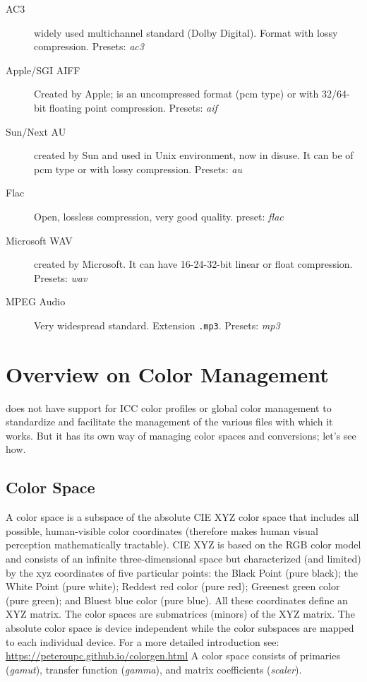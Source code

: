 \begin{description}
	\item[AC3] widely used multichannel standard (Dolby Digital). Format with lossy compression.
	\newline    Presets: \textit{ac3}
	\item[Apple/SGI AIFF] Created by Apple; is an uncompressed format (pcm type) or with 32/64-bit floating point compression.
	\newline    Presets: \textit{aif}
	\item[Sun/Next AU] created by Sun and used in Unix environment, now in disuse. It can be of pcm type or with lossy compression.
	\newline    Presets: \textit{au}
	\item[Flac] Open, lossless compression, very good quality.
	\newline    preset: \textit{flac}
	\item[Microsoft WAV]  created by Microsoft. It can have 16-24-32-bit linear or float compression.
	\newline    Presets: \textit{wav}
	\item[MPEG Audio] Very widespread standard. Extension \texttt{.mp3}.
	\newline    Presets: \textit{mp3}
\end{description}

\section{Overview on Color Management}%
\label{sec:overview_color_management}

\CGG{} does not have support for ICC color profiles or global color management to standardize and facilitate the management of the various files with which it works. But it has its own way of managing color spaces and conversions; let's see how.

\subsection{Color Space}%
\label{sub:the_color_spaces}

A color space is a subspace of the absolute CIE XYZ color space that includes all possible, human-visible color coordinates (therefore makes human visual perception mathematically tractable). CIE XYZ is based on the RGB color model and consists of an infinite three-dimensional space but characterized (and limited) by the xyz coordinates of five particular points: the Black Point (pure black); the White Point (pure white); Reddest red color (pure red); Greenest green color (pure green); and Bluest blue color (pure blue). All these coordinates define an XYZ matrix. The color spaces are submatrices (minors) of the XYZ matrix. The absolute color space is device independent while the color subspaces are mapped to each individual device.  For a more detailed introduction see: \small\href{https://peteroupc.github.io/colorgen.html}{https://peteroupc.github.io/colorgen.html}
\normalsize A color space consists of primaries (\textit{gamut}), transfer function (\textit{gamma}), and matrix coefficients (\textit{scaler}).

